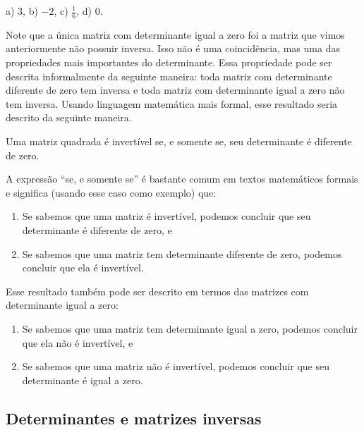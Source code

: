 \documentclass[main_estudante.tex]{subfiles}
\begin{document}
\begin{gabarito}
	\begin{gabaritoQuestao}
		a) $3$, b) $-2$, c) $\frac{1}{6}$, d) $0$.
	\end{gabaritoQuestao}
\end{gabarito}

Note que a única matriz com determinante igual a zero foi a matriz que vimos anteriormente não possuir inversa. Isso não é uma coincidência, mas uma das propriedades mais importantes do determinante. Essa propriedade pode ser descrita informalmente da seguinte maneira: toda matriz com determinante diferente de zero tem inversa e toda matriz com determinante igual a zero não tem inversa. Usando linguagem matemática mais formal, esse resultado seria descrito da seguinte maneira.

\begin{teorema}
 Uma matriz quadrada é invertível se, e somente se, seu determinante é diferente de zero.
\end{teorema}

A expressão ``se, e somente se'' é bastante comum em textos matemáticos formais e significa (usando esse caso como exemplo) que:

\begin{enumerate}
 \item Se sabemos que uma matriz é invertível, podemos concluir que seu determinante é diferente de zero, e
 \item Se sabemos que uma matriz tem determinante diferente de zero, podemos concluir que ela é invertível.
\end{enumerate}

Esse resultado também pode ser descrito em termos das matrizes com determinante igual a zero:

\begin{enumerate}
 \item Se sabemos que uma matriz tem determinante igual a zero, podemos concluir que ela não é invertível, e
 \item Se sabemos que uma matriz não é invertível, podemos concluir que seu determinante é igual a zero.
\end{enumerate}

\subsection*{Determinantes e matrizes inversas}
\end{document}
